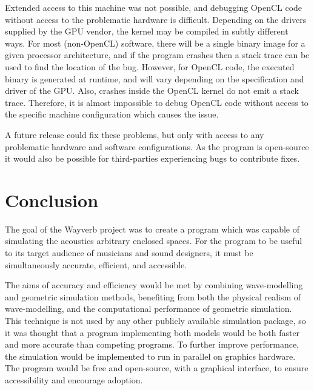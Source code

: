 \documentclass[]{scrreprt}
\begin{document}
Extended access to this machine was not possible, and debugging OpenCL
code without access to the problematic hardware is difficult. Depending
on the drivers supplied by the GPU vendor, the kernel may be compiled in
subtly different ways. For most (non-OpenCL) software, there will be a
single binary image for a given processor architecture, and if the
program crashes then a stack trace can be used to find the location of
the bug. However, for OpenCL code, the executed binary is generated at
runtime, and will vary depending on the specification and driver of the
GPU. Also, crashes inside the OpenCL kernel do not emit a stack trace.
Therefore, it is almost impossible to debug OpenCL code without access
to the specific machine configuration which causes the issue.

A future release could fix these problems, but only with access to any
problematic hardware and software configurations. As the program is
open-source it would also be possible for third-parties experiencing
bugs to contribute fixes.

\section{Conclusion}\label{conclusion}

The goal of the Wayverb project was to create a program which was
capable of simulating the acoustics arbitrary enclosed spaces. For the
program to be useful to its target audience of musicians and sound
designers, it must be simultaneously accurate, efficient, and
accessible.

The aims of accuracy and efficiency would be met by combining
wave-modelling and geometric simulation methods, benefiting from both
the physical realism of wave-modelling, and the computational
performance of geometric simulation. This technique is not used by any
other publicly available simulation package, so it was thought that a
program implementing both models would be both faster and more accurate
than competing programs. To further improve performance, the simulation
would be implemented to run in parallel on graphics hardware. The
program would be free and open-source, with a graphical interface, to
ensure accessibility and encourage adoption.
\end{document}
